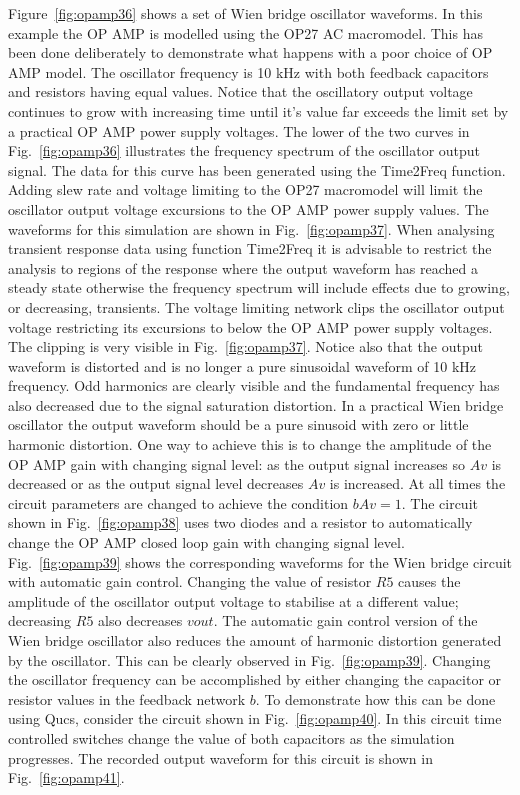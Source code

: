 Figure~\ref{fig:opamp36} shows a set of Wien bridge oscillator waveforms. In this example the OP AMP is modelled using the OP27 AC macromodel. This has been done deliberately to demonstrate what happens with a poor choice of OP AMP model.  The oscillator frequency is 10 kHz with both feedback capacitors and resistors having equal values. Notice that the oscillatory output voltage continues to grow with increasing time until it's value far exceeds the limit set by a practical OP AMP power supply voltages.  The lower of the two curves in Fig.~\ref{fig:opamp36} illustrates the frequency spectrum of the oscillator output signal. The data for this curve has been generated using the Time2Freq function.  Adding slew rate and voltage limiting to the OP27 macromodel will limit the oscillator output voltage excursions to the OP AMP power supply values. The waveforms for this simulation are shown in Fig.~\ref{fig:opamp37}.  When analysing transient response data using function Time2Freq it is advisable to restrict the analysis to regions of the response where the output waveform has reached a steady state otherwise the frequency spectrum will include effects due to growing, or decreasing, transients.  The voltage limiting network clips the oscillator output voltage restricting its excursions to below the OP AMP power supply voltages.  The clipping is very visible in Fig.~\ref{fig:opamp37}.  Notice also that the output waveform is distorted and is no longer a pure sinusoidal waveform of 10 kHz frequency.  Odd harmonics are clearly visible and the fundamental frequency has also decreased due to the signal saturation distortion.  In a practical Wien bridge oscillator the output waveform should be a pure sinusoid with zero or little harmonic distortion.  One way to achieve this is to change the amplitude of the OP AMP gain with changing signal level: as the output signal increases so $Av$ is decreased or as the output signal level decreases $Av$ is increased.  At all times the circuit parameters are changed to achieve the condition $b Av = 1$.  The circuit shown in Fig.~\ref{fig:opamp38} uses two diodes and a resistor to automatically change the OP AMP closed loop gain with changing signal level.  Fig.~\ref{fig:opamp39} shows the corresponding waveforms for the Wien bridge circuit with automatic gain control.  Changing the value of resistor $R5$ causes the amplitude of the oscillator output voltage to stabilise at a different value; decreasing $R5$ also decreases $vout$. The automatic gain control version of the Wien bridge oscillator also reduces the amount of harmonic distortion generated by the oscillator.  This can be clearly observed in Fig.~\ref{fig:opamp39}.  Changing the oscillator frequency can be accomplished by either changing the capacitor or resistor values in the feedback network $b$. To demonstrate how this can be done using Qucs, consider the circuit shown in Fig.~\ref{fig:opamp40}.  In this circuit time controlled switches change the value of both capacitors as the simulation progresses.  The recorded output waveform for this circuit is shown in Fig.~\ref{fig:opamp41}.


